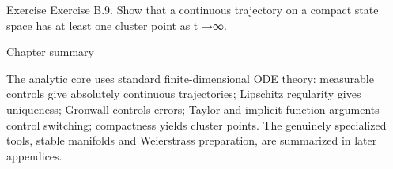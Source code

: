 \begin{statementbox}{Exercise}
Exercise B.9. Show that a continuous trajectory on a compact state space has at least one cluster point as t →∞.
\end{statementbox}

\begin{insightbox}{Chapter summary}
\end{insightbox}

The analytic core uses standard finite-dimensional ODE theory: measurable controls give absolutely continuous trajectories; Lipschitz regularity gives uniqueness; Gronwall controls errors; Taylor and implicit-function arguments control switching; compactness yields cluster points. The genuinely specialized tools, stable manifolds and Weierstrass preparation, are summarized in later appendices.

